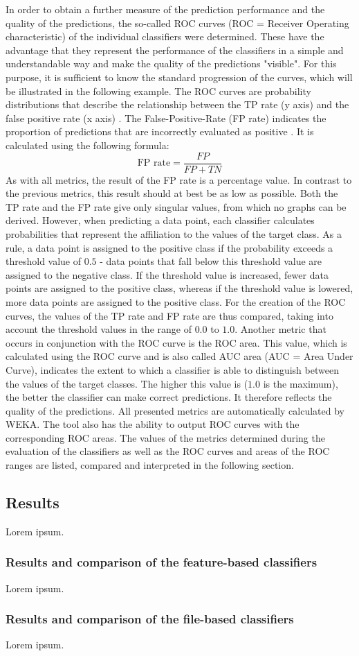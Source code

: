 In order to obtain a further measure of the prediction performance and the quality of the predictions, the so-called ROC curves (ROC = Receiver Operating characteristic) of the individual classifiers were determined. These have the advantage that they represent the performance of the classifiers in a simple and understandable way and make the quality of the predictions "visible". For this purpose, it is sufficient to know the standard progression of the curves, which will be illustrated in the following example.
The ROC curves are probability distributions that describe the relationship between the TP rate (y axis) and the false positive rate (x axis) \cite{Sammut2017}. The False-Positive-Rate (FP rate) indicates the proportion of predictions that are incorrectly evaluated as positive \cite{Alpaydin2010}. It is calculated using the following formula:
\\\[\text{FP rate} = \frac{FP}{FP+TN}\]
As with all metrics, the result of the FP rate is a percentage value. In contrast to the previous metrics, this result should at best be as low as possible. Both the TP rate and the FP rate give only singular values, from which no graphs can be derived. However, when predicting a data point, each classifier calculates probabilities that represent the affiliation to the values of the target class. As a rule, a data point is assigned to the positive class if the probability exceeds a threshold value of $0.5$ - data points that fall below this threshold value are assigned to the negative class. If the threshold value is increased, fewer data points are assigned to the positive class, whereas if the threshold value is lowered, more data points are assigned to the positive class. For the creation of the ROC curves, the values of the TP rate and FP rate are thus compared, taking into account the threshold values in the range of $0.0$ to $1.0$.
Another metric that occurs in conjunction with the ROC curve is the ROC area. This value, which is calculated using the ROC curve and is also called AUC area (AUC = Area Under Curve), indicates the extent to which a classifier is able to distinguish between the values of the target classes. The higher this value is ($1.0$ is the maximum), the better the classifier can make correct predictions. It therefore reflects the quality of the predictions.
All presented metrics are automatically calculated by WEKA. The tool also has the ability to output ROC curves with the corresponding ROC areas. The values of the metrics determined during the evaluation of the classifiers as well as the ROC curves and areas of the ROC ranges are listed, compared and interpreted in the following section.

\subsection{Results}

Lorem ipsum.

\subsubsection*{Results and comparison of the feature-based classifiers}

Lorem ipsum.

\subsubsection*{Results and comparison of the file-based classifiers}

Lorem ipsum.
